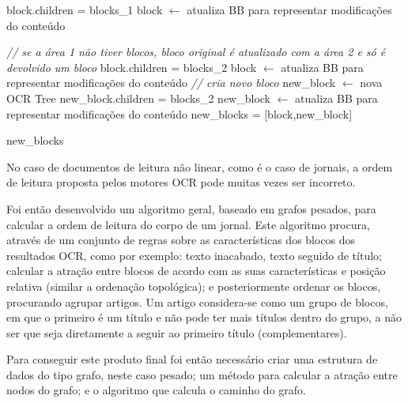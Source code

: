 \begin{breakablealgorithm}
\begin{algorithmic}[1]
			\State block.children = blocks\_1
			\State block $\leftarrow$ atualiza BB para representar modificações do conteúdo
			
		\Else
			\State \textit{// se a área 1 não tiver blocos, bloco original é atualizado com a área 2 e só é devolvido um bloco}
				\State block.children = blocks\_2
				\State block $\leftarrow$ atualiza BB para representar modificações do conteúdo
			\Else
				\State \textit{// cria novo bloco}
				\State new\_block $\leftarrow$ nova OCR Tree
				\State new\_block.children = blocks\_2
				\State new\_block $\leftarrow$ atualiza BB para representar modificações do conteúdo
				\State new\_blocks = [block,new\_block]
				
			\EndIf
			
		\EndIf
		
		\Return new\_blocks
		
	\end{algorithmic}
\end{breakablealgorithm}




\label{contribution_reading_order}

No caso de documentos de leitura não linear, como é o caso de jornais, a ordem de leitura proposta pelos motores OCR pode muitas vezes ser incorreto.


Foi então desenvolvido um algoritmo geral, baseado em grafos pesados, para calcular a ordem de leitura do corpo de um jornal. Este algoritmo procura, através de um conjunto de regras sobre as características dos blocos dos resultados OCR, como por exemplo: texto inacabado, texto seguido de título; calcular a atração entre blocos de acordo com as suas características e posição relativa (similar a ordenação topológica); e posteriormente ordenar os blocos, procurando agrupar artigos. Um artigo considera-se como um grupo de blocos, em que o primeiro é um título e não pode ter mais títulos dentro do grupo, a não ser que seja diretamente a seguir ao primeiro título (complementares).

Para conseguir este produto final foi então necessário criar uma estrutura de dados do tipo grafo, neste caso pesado; um método para calcular a atração entre nodos do grafo; e o algoritmo que calcula o caminho do grafo.

